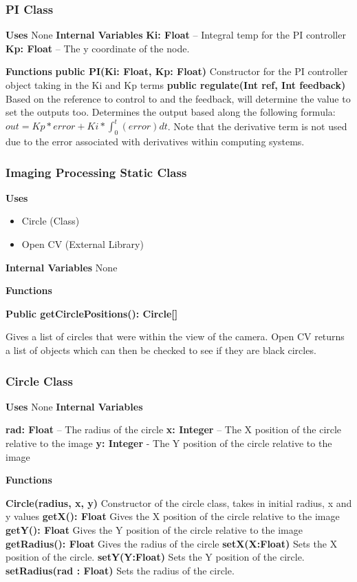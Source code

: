 \documentclass [10pt]{article}
\begin{document}
\subsubsection{PI Class}
\textbf{Uses}
None 
\textbf{Internal Variables}
\textbf{Ki: Float} – Integral temp for the PI controller
\textbf{Kp: Float} – The y coordinate of the node.

\textbf{Functions}
\textbf{public PI(Ki: Float, Kp: Float)}
Constructor for the PI controller object taking in the Ki and Kp terms
\textbf{public regulate(Int ref, Int feedback)}
Based on the reference to control to and the feedback, will determine the value to set the outputs too. Determines the output based along the following formula: $ out = Kp*error+Ki*\int_{0}^{t}(error)dt$. Note that the derivative term is not used due to the error associated with derivatives within computing systems.


\subsubsection{Imaging Processing Static Class}
\textbf{Uses}
\begin{itemize}
	\item Circle (Class)
	\item Open CV (External Library)
\end{itemize}


\textbf{Internal Variables}
None

\textbf{Functions}

\textbf{Public getCirclePositions(): Circle[]}

Gives a list of circles that were within the view of the camera. Open CV returns a list of objects which can then be checked to see if they are black circles.

\subsubsection{Circle Class}

\textbf{Uses}
None
\textbf{Internal Variables}

\textbf{rad: Float} – The radius of the circle
\textbf{x: Integer} – The X position of the circle relative to the image
\textbf{y: Integer} - The Y position of the circle relative to the image 

\textbf{Functions}

\textbf{Circle(radius, x, y)}
Constructor of the circle class, takes in initial radius, x and y values
\textbf{getX(): Float}
Gives the X position of the circle relative to the image
\textbf{getY(): Float}
Gives the Y position of the circle relative to the image
\textbf{getRadius(): Float}
Gives the radius of the circle
\textbf{setX(X:Float)}
Sets the X position of the circle.
\textbf{setY(Y:Float)}
Sets the Y position of the circle.
\textbf{setRadius(rad : Float)}
Sets the radius of the circle.
\end{document}
